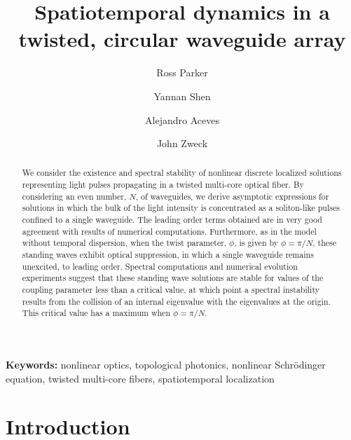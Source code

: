 \documentclass[11pt,reqno]{amsart}
\begin{document}
\title{Spatiotemporal dynamics in a twisted, circular waveguide array}

\author{Ross Parker}
\address{Department of Mathematics, Southern Methodist University, 
Dallas, TX 75275, USA}

\author{Yannan Shen} 
\address{Department of Mathematics, University of Kansas, Lawrence, KS 66045, USA}

\author{Alejandro Aceves}
\address{Department of Mathematics, Southern Methodist University, 
Dallas, TX 75275, USA}

\author{John Zweck}
\address{Department of Mathematics, The University of Texas at Dallas, 
Richardson, TX 75080, USA}

\begin{abstract}
We consider the existence and spectral stability of nonlinear discrete localized solutions representing light pulses propagating in a twisted multi-core optical fiber. By considering an even number, $N$, of waveguides, we derive asymptotic expressions for solutions in which the bulk of the light intensity is concentrated as a soliton-like pulses confined to a single waveguide. The leading order terms obtained are in very good agreement with results of numerical computations. Furthermore, as in the model without temporal dispersion, when the twist parameter, $\phi$, is given by $\phi = \pi/N$, these standing waves exhibit optical suppression, in which a single waveguide remains unexcited, to leading order. Spectral computations and numerical evolution experiments suggest that these standing wave solutions are stable for values of the coupling parameter less than a critical value, at which point a spectral instability results from the collision of an internal eigenvalue with the eigenvalues at the origin. This critical value has a maximum when $\phi = \pi/N$.
\end{abstract}

\noindent

\maketitle

\textbf{Keywords:} nonlinear optics, topological photonics, nonlinear Schr\"odinger equation, twisted multi-core fibers, spatiotemporal localization


\section{Introduction}
\end{document}
